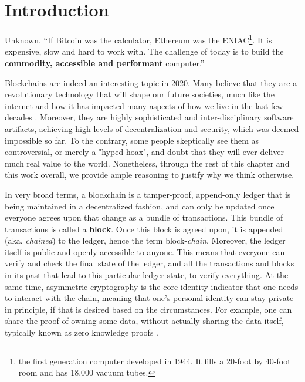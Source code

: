 \chapter{Introduction} \label{chap:intoroduction}

\ifpdf
    \graphicspath{{1_introduction/figures/PNG/}{1_introduction/figures/PDF/}{1_introduction/figures/}}
\else
    \graphicspath{{1_introduction/figures/EPS/}{1_introduction/figures/}}
\fi

\begin{chapquote}{Unknown.}
``If Bitcoin was the calculator, Ethereum was the ENIAC\footnote{the first generation computer
developed in 1944. It fills a 20-foot by 40-foot room and has 18,000 vacuum tubes.}. It is
expensive, slow and hard to work with. The challenge of today is to build the \textbf{commodity,
accessible and performant} computer.''
\end{chapquote}


Blockchains are indeed an interesting topic in 2020. Many believe that they are a revolutionary
technology that will shape our future societies, much like the internet and how it has impacted many
aspects of how we live in the last few decades \cite{will_blockchain_be_big_deal}. Moreover, they are
highly sophisticated and inter-disciplinary software artifacts, achieving high levels of
decentralization and security, which was deemed impossible so far. To the contrary, some people
skeptically see them as controversial, or merely a "hyped hoax", and doubt that they will ever
deliver much real value to the world. Nonetheless, through the rest of this chapter and this work
overall, we provide ample reasoning to justify why we think otherwise.

In very broad terms, a blockchain is a tamper-proof, append-only ledger that is being maintained in
a decentralized fashion, and can only be updated once everyone agrees upon that change as a bundle
of transactions. This bundle of transactions is called a \textbf{block}. Once this block is agreed
upon, it is appended (aka. \textit{chained}) to the ledger, hence the term block-\textit{chain}.
Moreover, the ledger itself is public and openly accessible to anyone. This means that everyone can
verify and check the final state of the ledger, and all the transactions and blocks in its past that
lead to this particular ledger state, to verify everything. At the same time, asymmetric cryptography
is the core identity indicator that one needs to interact with the chain, meaning that one's
personal identity can stay private in principle, if that is desired based on the circumstances. For
example, one can share the proof of owning some data, without actually sharing the data itself,
typically known as zero knowledge proofs \cite{Goldreich_Oren_1994_ZK}.

